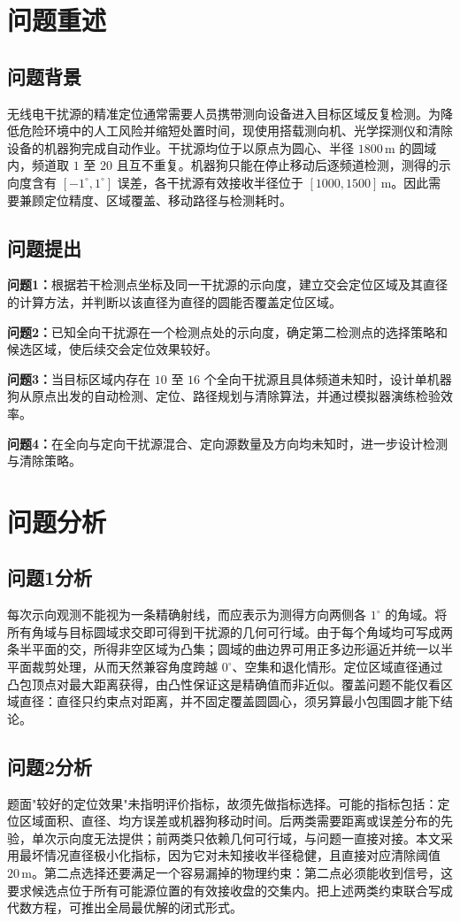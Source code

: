 \documentclass[12pt,a4paper]{ctexart}
\begin{document}
\section{问题重述}
\subsection{问题背景}
无线电干扰源的精准定位通常需要人员携带测向设备进入目标区域反复检测。为降低危险环境中的人工风险并缩短处置时间，现使用搭载测向机、光学探测仪和清除设备的机器狗完成自动作业。干扰源均位于以原点为圆心、半径 $1800\,\mathrm{m}$ 的圆域内，频道取 $1$ 至 $20$ 且互不重复。机器狗只能在停止移动后逐频道检测，测得的示向度含有 $[-1^\circ,1^\circ]$ 误差，各干扰源有效接收半径位于 $[1000,1500]\,\mathrm{m}$。因此需要兼顾定位精度、区域覆盖、移动路径与检测耗时。

\subsection{问题提出}
\textbf{问题1：}根据若干检测点坐标及同一干扰源的示向度，建立交会定位区域及其直径的计算方法，并判断以该直径为直径的圆能否覆盖定位区域。

\textbf{问题2：}已知全向干扰源在一个检测点处的示向度，确定第二检测点的选择策略和候选区域，使后续交会定位效果较好。

\textbf{问题3：}当目标区域内存在 $10$ 至 $16$ 个全向干扰源且具体频道未知时，设计单机器狗从原点出发的自动检测、定位、路径规划与清除算法，并通过模拟器演练检验效率。

\textbf{问题4：}在全向与定向干扰源混合、定向源数量及方向均未知时，进一步设计检测与清除策略。

\section{问题分析}

\subsection{问题1分析}
每次示向观测不能视为一条精确射线，而应表示为测得方向两侧各 $1^\circ$ 的角域。将所有角域与目标圆域求交即可得到干扰源的几何可行域。由于每个角域均可写成两条半平面的交，所得非空区域为凸集；圆域的曲边界可用正多边形逼近并统一以半平面裁剪处理，从而天然兼容角度跨越 $0^\circ$、空集和退化情形。定位区域直径通过凸包顶点对最大距离获得，由凸性保证这是精确值而非近似。覆盖问题不能仅看区域直径：直径只约束点对距离，并不固定覆盖圆圆心，须另算最小包围圆才能下结论。

\subsection{问题2分析}
题面"较好的定位效果"未指明评价指标，故须先做指标选择。可能的指标包括：定位区域面积、直径、均方误差或机器狗移动时间。后两类需要距离或误差分布的先验，单次示向度无法提供；前两类只依赖几何可行域，与问题一直接对接。本文采用最坏情况直径极小化指标，因为它对未知接收半径稳健，且直接对应清除阈值 $20\,\mathrm{m}$。第二点选择还要满足一个容易漏掉的物理约束：第二点必须能收到信号，这要求候选点位于所有可能源位置的有效接收盘的交集内。把上述两类约束联合写成代数方程，可推出全局最优解的闭式形式。
\end{document}
